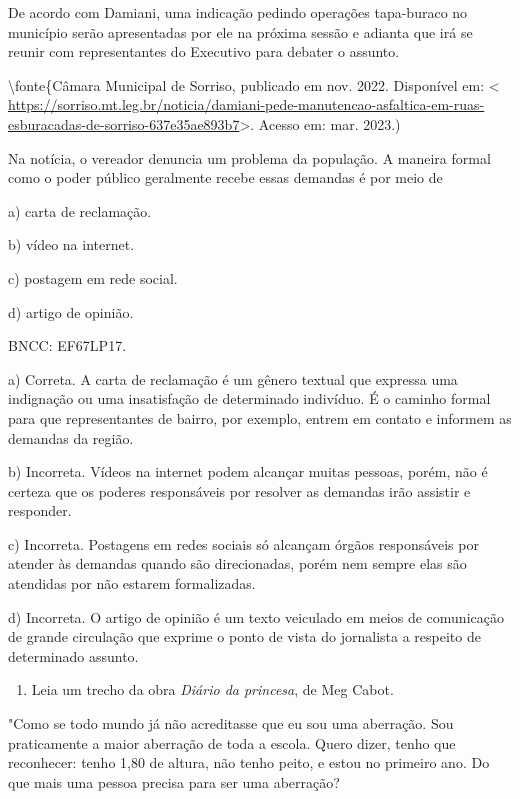 {De acordo com Damiani, uma indicação pedindo operações tapa-buraco no
município serão apresentadas por ele na próxima sessão e adianta que irá
se reunir com representantes do Executivo para debater o assunto.

\textbackslash fonte\{Câmara Municipal de Sorriso, publicado em nov.
2022. Disponível em: \textless{}
\url{https://sorriso.mt.leg.br/noticia/damiani-pede-manutencao-asfaltica-em-ruas-esburacadas-de-sorriso-637e35ae893b7}\textgreater.
Acesso em: mar. 2023.)

Na notícia, o vereador denuncia um problema da população. A maneira
formal como o poder público geralmente recebe essas demandas é por meio
de

a) carta de reclamação.

b) vídeo na internet.

c) postagem em rede social.

d) artigo de opinião.

BNCC: EF67LP17.

a) Correta. A carta de reclamação é um gênero textual que expressa uma
indignação ou uma insatisfação de determinado indivíduo. É o caminho
formal para que representantes de bairro, por exemplo, entrem em contato
e informem as demandas da região.

b) Incorreta. Vídeos na internet podem alcançar muitas pessoas, porém,
não é certeza que os poderes responsáveis por resolver as demandas irão
assistir e responder.

c) Incorreta. Postagens em redes sociais só alcançam órgãos responsáveis
por atender às demandas quando são direcionadas, porém nem sempre elas
são atendidas por não estarem formalizadas.

d) Incorreta. O artigo de opinião é um texto veiculado em meios de
comunicação de grande circulação que exprime o ponto de vista do
jornalista a respeito de determinado assunto.

\begin{enumerate}
\def\labelenumi{\arabic{enumi}.}
\setcounter{enumi}{14}
\tightlist
\item
  Leia um trecho da obra \emph{Diário da princesa}, de Meg Cabot.
\end{enumerate}

"Como se todo mundo já não acreditasse que eu sou uma aberração. Sou
praticamente a maior aberração de toda a escola. Quero dizer, tenho que
reconhecer: tenho 1,80 de altura, não tenho peito, e estou no primeiro
ano. Do que mais uma pessoa precisa para ser uma aberração?

}
